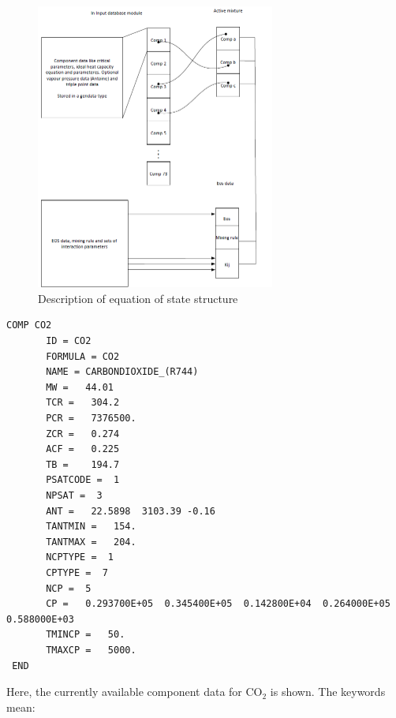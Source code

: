 \documentclass[a4paper, 12pt, english, sintefheadings, sintefcolour]{sintefmemo}
\begin{document}
\begin{figure}[Htb]
\centering
\includegraphics[width=0.70\textwidth]{eos_structure2.png}
\caption{Description of equation of state structure}
\label{fig:eos_structure2}
\end{figure}   

\clearpage

\begin{verbatim}
COMP CO2
       ID = CO2
       FORMULA = CO2
       NAME = CARBONDIOXIDE_(R744)
       MW =   44.01
       TCR =   304.2
       PCR =   7376500.
       ZCR =   0.274
       ACF =   0.225
       TB =    194.7
       PSATCODE =  1
       NPSAT =  3
       ANT =   22.5898  3103.39 -0.16
       TANTMIN =   154.
       TANTMAX =   204.
       NCPTYPE =  1
       CPTYPE =  7
       NCP =  5
       CP =   0.293700E+05  0.345400E+05  0.142800E+04  0.264000E+05  0.588000E+03
       TMINCP =   50.
       TMAXCP =   5000.
 END
\end{verbatim}

Here, the currently available component data for CO$_2$ is shown. The keywords mean:
\end{document}
